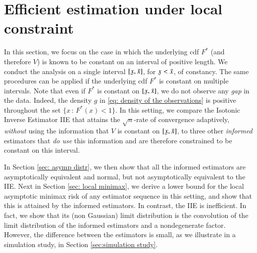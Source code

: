 \section{Efficient estimation under local constraint}\label{sec: section 2}

In this section, we focus on the case in which the underlying cdf $F^*$ (and therefore $V$) is known to be constant on an interval of positive length. We conduct the analysis on a single interval $[\ubar{x},\bar{x}]$, for $\ubar{x}<\bar{x}$, of constancy. The same procedures can be applied if the underlying cdf $F^*$ is constant on multiple intervals. Note that even if $F^*$ is constant on  $[\ubar{x},\bar{x}]$, we do not observe any \textit{gap} in the data. Indeed, the density $g$ in \eqref{eq: density of the observations} is positive throughout the set $\{ x \, : \, F^*(x) < 1 \}$. In this setting, we compare the Isotonic Inverse Estimator IIE that attains the $\sqrt{n}$-rate of convergence adaptively, \textit{without} using the information that $V$ is constant on $[\ubar{x},\bar{x}]$, to three other \textit{informed} estimators that \textit{do use} this information and are therefore constrained to be constant on this interval. 

In Section \ref{sec: asymp distr}, we then show that all the informed estimators are asymptotically equivalent and normal, but not asymptotically equivalent to the IIE. Next in Section \ref{sec: local minimax}, we derive a lower bound for the local asymptotic minimax risk of any estimator sequence in this setting, and show that this is attained by the informed estimators. In contrast, the IIE is inefficient. In fact, we show that its (non Gaussian) limit distribution is the convolution of the limit distribution of the informed estimators and a nondegenerate factor. However, the difference between the estimators is small, as we illustrate in a simulation study, in Section \ref{sec:simulation study}.

